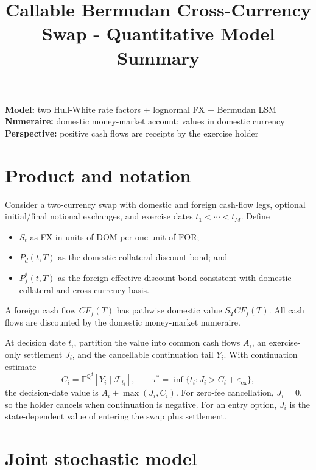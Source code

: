 \documentclass[conference]{IEEEtran}
\title{Callable Bermudan Cross-Currency Swap - Quantitative Model Summary}
\author{\TGIRArticleAuthorBlock}
\newcommand{\Qd}{\mathbb{Q}^{d}}
\newcommand{\E}{\mathbb{E}}
\newcommand{\F}{\mathcal{F}}
\newcommand{\DOM}{\ensuremath{\mathrm{DOM}}}
\newcommand{\FOR}{\ensuremath{\mathrm{FOR}}}
\begin{document}
\maketitle

\noindent\textbf{Model:} two Hull-White rate factors + lognormal FX + Bermudan LSM\\
\textbf{Numeraire:} domestic money-market account; values in domestic currency\\
\textbf{Perspective:} positive cash flows are receipts by the exercise holder

\section{Product and notation}

Consider a two-currency swap with domestic and foreign cash-flow legs, optional initial/final notional exchanges, and exercise dates $t_1<\cdots<t_M$. Define
\begin{itemize}
  \item $S_t$ as FX in units of \DOM{} per one unit of \FOR{};
  \item $P_d(t,T)$ as the domestic collateral discount bond; and
  \item $P_f^{*}(t,T)$ as the foreign effective discount bond consistent with domestic collateral and cross-currency basis.
\end{itemize}
A foreign cash flow $CF_f(T)$ has pathwise domestic value $S_TCF_f(T)$. All cash flows are discounted by the domestic money-market numeraire.

At decision date $t_i$, partition the value into common cash flows $A_i$, an exercise-only settlement $J_i$, and the cancellable continuation tail $Y_i$. With continuation estimate
\[
  C_i=\E^{\Qd}\!\left[Y_i\mid\F_{t_i}\right],
  \qquad
  \tau^*=\inf\{t_i:J_i>C_i+\varepsilon_{\mathrm{ex}}\},
\]
the decision-date value is $A_i+\max(J_i,C_i)$. For zero-fee cancellation, $J_i=0$, so the holder cancels when continuation is negative. For an entry option, $J_i$ is the state-dependent value of entering the swap plus settlement.

\section{Joint stochastic model}
\end{document}
